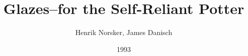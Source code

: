 \documentclass[10pt,a4paper]{book}
\begin{document}
\begin{titlepage}
\title{Glazes--for the Self-Reliant Potter}
\date{1993}
\author{Henrik Norsker, James Danisch}
\maketitle
\end{titlepage}
\tableofcontents
%
%
%
%
%
%
%
%
%
%
%
%
%
%
%
%
%
\begin{appendix}
%
%
%
%
%
%
%







%
%
\end{appendix}
\end{document}
